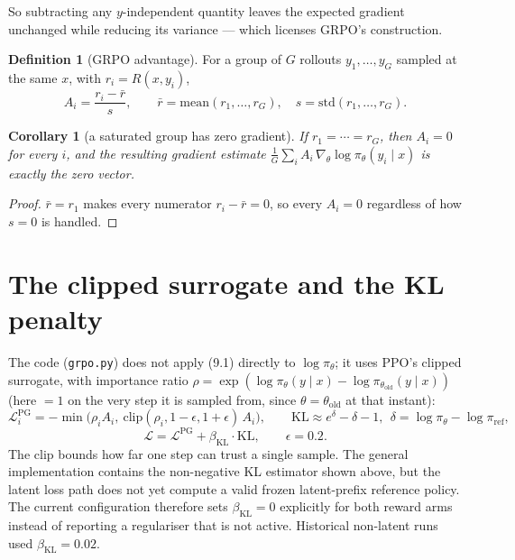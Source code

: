 \documentclass[11pt]{article}
\newtheorem{corollary}[theorem]{Corollary}
\theoremstyle{definition}
\newtheorem{definition}[theorem]{Definition}
\begin{document}
So subtracting any $y$-independent quantity leaves the expected gradient unchanged while reducing its variance — which licenses GRPO's construction.

\begin{definition}[GRPO advantage]
\label{def:grpo-adv}
For a group of $G$ rollouts $y_1,\dots,y_G$ sampled at the same $x$, with $r_i = R(x,y_i)$,
\[
A_i = \frac{r_i - \bar r}{s},\qquad \bar r = \mathrm{mean}(r_1,\dots,r_G),
\quad s = \mathrm{std}(r_1,\dots,r_G).
\tag{9.1}
\]
\end{definition}

\begin{corollary}[a saturated group has zero gradient]
\label{cor:zero-grp}
If $r_1=\cdots=r_G$, then $A_i=0$ for every $i$, and the resulting gradient estimate $\frac1G\sum_i A_i\,\nabla_\theta\log\pi_\theta(y_i\mid x)$ is exactly the zero vector.
\end{corollary}
\begin{proof}
$\bar r = r_1$ makes every numerator $r_i-\bar r=0$, so every $A_i=0$ regardless of how $s=0$ is handled.
\end{proof}

\begin{center}
\end{center}

\section{The clipped surrogate and the KL penalty}

The code (\texttt{grpo.py}) does not apply (9.1) directly to $\log\pi_\theta$; it uses PPO's clipped surrogate, with importance ratio $\rho = \exp(\log\pi_\theta(y\mid x) - \log\pi_{\theta_{\mathrm{old}}}(y\mid x))$ (here $=1$ on the very step it is sampled from, since $\theta = \theta_{\mathrm{old}}$ at that instant):
\[
\mathcal{L}^{\mathrm{PG}}_i = -\min\big(\rho_i A_i,\ \mathrm{clip}(\rho_i, 1-\epsilon, 1+\epsilon)\,A_i\big),
\qquad
\mathrm{KL} \approx e^{\delta} - \delta - 1,\ \ \delta = \log\pi_\theta - \log\pi_{\mathrm{ref}},
\]
\[
\mathcal{L} = \mathcal{L}^{\mathrm{PG}} + \beta_{\mathrm{KL}}\cdot\mathrm{KL},
\qquad \epsilon = 0.2.
\]
The clip bounds how far one step can trust a single sample. The general implementation contains the non-negative KL estimator shown above, but the latent loss path does not yet compute a valid frozen latent-prefix reference policy. The current configuration therefore sets $\beta_{\mathrm{KL}}=0$ explicitly for both reward arms instead of reporting a regulariser that is not active. Historical non-latent runs used $\beta_{\mathrm{KL}}=0.02$.
\end{document}
